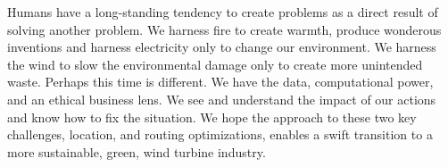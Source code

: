 Humans have a long-standing tendency to create problems as a direct result of solving another problem. We harness fire to create warmth, produce wonderous inventions and harness electricity only to change our environment. We harness the wind to slow the environmental damage only to create more unintended waste. Perhaps this time is different. We have the data, computational power, and an ethical business lens. We see and understand the impact of our actions and know how to fix the situation. We hope the approach to these two key challenges, location, and routing optimizations, enables a swift transition to a more sustainable, green, wind turbine industry. 